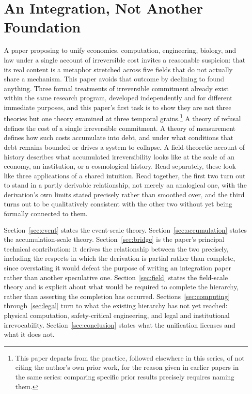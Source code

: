 \documentclass[11pt]{article}
\theoremstyle{plain}
\begin{document}
\newpage
\tableofcontents
\bigskip

\section{An Integration, Not Another Foundation}

A paper proposing to unify economics, computation, engineering, biology, and law under a single account of irreversible cost invites a reasonable suspicion: that its real content is a metaphor stretched across five fields that do not actually share a mechanism. This paper avoids that outcome by declining to found anything. Three formal treatments of irreversible commitment already exist within the same research program, developed independently and for different immediate purposes, and this paper's first task is to show they are not three theories but one theory examined at three temporal grains.\footnote{This paper departs from the practice, followed elsewhere in this series, of not citing the author's own prior work, for the reason given in earlier papers in the same series: comparing specific prior results precisely requires naming them.} A theory of refusal defines the cost of a single irreversible commitment. A theory of measurement defines how such costs accumulate into debt, and under what conditions that debt remains bounded or drives a system to collapse. A field-theoretic account of history describes what accumulated irreversibility looks like at the scale of an economy, an institution, or a cosmological history. Read separately, these look like three applications of a shared intuition. Read together, the first two turn out to stand in a partly derivable relationship, not merely an analogical one, with the derivation's own limits stated precisely rather than smoothed over, and the third turns out to be qualitatively consistent with the other two without yet being formally connected to them.

Section~\ref{sec:event} states the event-scale theory. Section~\ref{sec:accumulation} states the accumulation-scale theory. Section~\ref{sec:bridge} is the paper's principal technical contribution: it derives the relationship between the two precisely, including the respects in which the derivation is partial rather than complete, since overstating it would defeat the purpose of writing an integration paper rather than another speculative one. Section~\ref{sec:field} states the field-scale theory and is explicit about what would be required to complete the hierarchy, rather than asserting the completion has occurred. Sections~\ref{sec:computing} through~\ref{sec:legal} turn to what the existing hierarchy has not yet reached: physical computation, safety-critical engineering, and legal and institutional irrevocability. Section~\ref{sec:conclusion} states what the unification licenses and what it does not.
\end{document}
